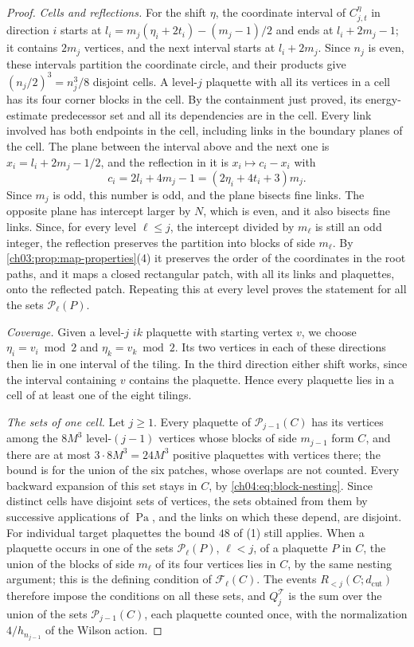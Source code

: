\begin{proof}
\emph{Cells and reflections.} For the shift $\eta$, the coordinate interval of $C^\eta_{j,t}$ in direction $i$ starts at $l_i=m_j(\eta_i+2t_i)-(m_j-1)/2$ and ends at $l_i+2m_j-1$; it contains $2m_j$ vertices, and the next interval starts at $l_i+2m_j$. Since $n_j$ is even, these intervals partition the coordinate circle, and their products give $(n_j/2)^3=n_j^3/8$ disjoint cells. A level-$j$ plaquette with all its vertices in a cell has its four corner blocks in the cell. By the containment just proved, its energy-estimate predecessor set and all its dependencies are in the cell. Every link involved has both endpoints in the cell, including links in the boundary planes of the cell. The plane between the interval above and the next one is $x_i=l_i+2m_j-1/2$, and the reflection in it is $x_i\mapsto c_i-x_i$ with
\[
 c_i=2l_i+4m_j-1=(2\eta_i+4t_i+3)m_j.
\]
Since $m_j$ is odd, this number is odd, and the plane bisects fine links. The opposite plane has intercept larger by $N$, which is even, and it also bisects fine links. Since, for every level $\ell\le j$, the intercept divided by $m_\ell$ is still an odd integer, the reflection preserves the partition into blocks of side $m_\ell$. By \cref{ch03:prop:map-properties}(4) it preserves the order of the coordinates in the root paths, and it maps a closed rectangular patch, with all its links and plaquettes, onto the reflected patch. Repeating this at every level proves the statement for all the sets $\mathcal P_\ell(P)$.

\emph{Coverage.} Given a level-$j$ $ik$ plaquette with starting vertex $v$, we choose $\eta_i=v_i\bmod2$ and $\eta_k=v_k\bmod2$. Its two vertices in each of these directions then lie in one interval of the tiling. In the third direction either shift works, since the interval containing $v$ contains the plaquette. Hence every plaquette lies in a cell of at least one of the eight tilings.

\emph{The sets of one cell.} Let $j\ge1$. Every plaquette of $\mathcal P_{j-1}(C)$ has its vertices among the $8M^3$ level-$(j-1)$ vertices whose blocks of side $m_{j-1}$ form $C$, and there are at most $3\cdot8M^3=24M^3$ positive plaquettes with vertices there; the bound is for the union of the six patches, whose overlaps are not counted. Every backward expansion of this set stays in $C$, by \eqref{ch04:eq:block-nesting}. Since distinct cells have disjoint sets of vertices, the sets obtained from them by successive applications of $\operatorname{Pa}$, and the links on which these depend, are disjoint. For individual target plaquettes the bound $48$ of (1) still applies. When a plaquette occurs in one of the sets $\mathcal P_\ell(P)$, $\ell<j$, of a plaquette $P$ in $C$, the union of the blocks of side $m_\ell$ of its four vertices lies in $C$, by the same nesting argument; this is the defining condition of $\mathcal F_\ell(C)$. The events $R_{<j}(C;d_{\mathrm{cut}})$ therefore impose the conditions on all these sets, and $Q^{\mathcal T}_j$ is the sum over the union of the sets $\mathcal P_{j-1}(C)$, each plaquette counted once, with the normalization $4/h_{n_{j-1}}$ of the Wilson action.


\end{proof}
